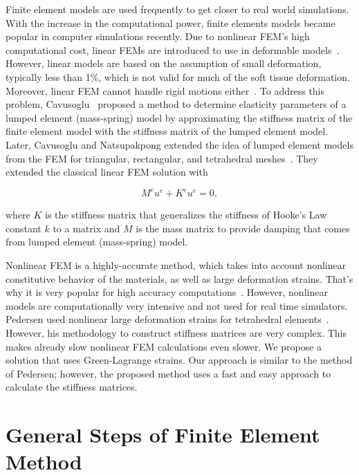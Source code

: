 Finite element models are used frequently to get closer to real world simulations. With the increase in the computational power, finite elements models became popular in computer simulations recently. Due to nonlinear FEM's high computational cost, linear FEMs are introduced to use in deformable models~\cite{Koch96}. However, linear models are based on the assumption of small deformation, typically less than 1\%, which is not valid for much of the soft tissue deformation. Moreover, linear FEM cannot handle rigid motions either~\cite{Zhuangy00}. To address this problem, Cavusoglu~\cite{Cavusoglu00} proposed a method to determine elasticity parameters of a lumped element (mass-spring) model by approximating the stiffness matrix of the finite element model with the stiffness matrix of the lumped element model. Later, Cavusoglu and Natsupakpong extended the idea of lumped element models from the FEM for triangular, rectangular, and tetrahedral meshes~\cite{Natsupakpong2010}. They extended the classical linear FEM solution with

\begin{equation}
M^eu^e + K^eu^e = 0,
\label{eqn:fem01}
\end{equation}

\noindent where $K$ is the stiffness matrix that generalizes the stiffness of Hooke's Law constant $k$ to a matrix and $M$ is the mass matrix to provide damping that comes from lumped element (mass-spring) model.

Nonlinear FEM is a highly-accurate method, which takes into account nonlinear constitutive behavior of the materials, as well as large deformation strains. That's why it is very popular for high accuracy computations~\cite{Natsupakpong2010}. However, nonlinear models are computationally very intensive and not used for real time simulators. Pedersen used nonlinear large deformation strains for tetrahedral elements~\cite{Pedersen06}. However, his methodology to construct stiffness matrices are very complex. This makes already slow nonlinear FEM calculations even slower.
We propose a solution that uses Green-Lagrange strains. Our approach is similar to the method of Pedersen; however, the proposed method uses a fast and easy approach to calculate the stiffness matrices.

\section{General Steps of Finite Element Method}
\label{sec:steps}

